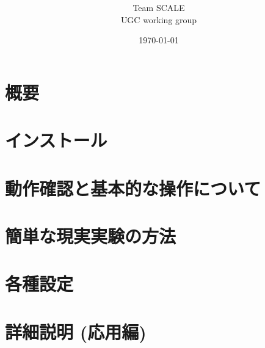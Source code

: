 \documentclass[a4paper]{jreport}
\title{{\vspace{2cm}{\Large Version \version} }}
\author{\Large Team SCALE\\ UGC working group}
\date{\today}
\begin{document}
\maketitle
\ClearWallPaper
{}
\tableofcontents

\chapter{概要} \label{chap:overview}



\chapter{インストール} \label{chap:install}


\chapter{動作確認と基本的な操作について} \label{chap:tutorial_ideal}





\chapter{簡単な現実実験の方法} \label{chap:tutorial_real}








\chapter{各種設定} \label{chap:basic_usel}





\clearpage














\chapter{詳細説明 (応用編)} \label{chap:detail}

\end{document}
